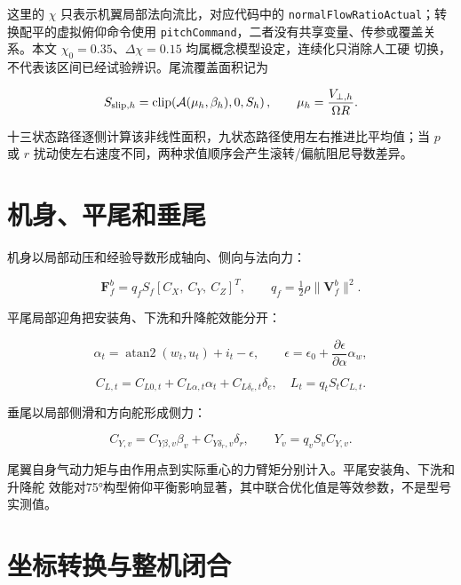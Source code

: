 \documentclass[UTF8,12pt,oneside,openany,fontset=windows]{ctexbook}
\begin{document}
这里的 \(\chi\) 只表示机翼局部法向流比，对应代码中的 \texttt{normalFlowRatioActual}；转换配平的虚拟俯仰命令使用 \texttt{pitchCommand}，二者没有共享变量、传参或覆盖关系。本文 \(\chi_0=0.35\)、\(\Delta\chi=0.15\) 均属概念模型设定，连续化只消除人工硬 切换，不代表该区间已经试验辨识。尾流覆盖面积记为

\begin{equation}
S_{{\rm slip},h}=\operatorname{clip}\!\left(\mathcal A(\mu_h,\beta_h),0,S_h\right),
\qquad \mu_h=\frac{V_{\perp,h}}{\Omega R}.
\end{equation}

十三状态路径逐侧计算该非线性面积，九状态路径使用左右推进比平均值；当 \(p\) 或 \(r\) 扰动使左右速度不同，两种求值顺序会产生滚转/偏航阻尼导数差异。

\section{机身、平尾和垂尾}

机身以局部动压和经验导数形成轴向、侧向与法向力：

\begin{equation}
\mathbf F_f^b=q_fS_f[C_X,\ C_Y,\ C_Z]^T,\qquad
q_f=\tfrac12\rho\|\mathbf V_f^b\|^2 .
\end{equation}

平尾局部迎角把安装角、下洗和升降舵效能分开：

\begin{equation}
\alpha_t=\operatorname{atan2}(w_t,u_t)+i_t-\epsilon,\qquad
\epsilon=\epsilon_0+\frac{\partial\epsilon}{\partial\alpha}\alpha_w,
\end{equation}

\begin{equation}
C_{L,t}=C_{L0,t}+C_{L\alpha,t}\alpha_t+C_{L\delta_e,t}\delta_e,
\quad L_t=q_tS_tC_{L,t}.
\end{equation}

垂尾以局部侧滑和方向舵形成侧力：

\begin{equation}
C_{Y,v}=C_{Y\beta,v}\beta_v+C_{Y\delta_r,v}\delta_r,\qquad
Y_v=q_vS_vC_{Y,v}.
\end{equation}

尾翼自身气动力矩与由作用点到实际重心的力臂矩分别计入。平尾安装角、下洗和升降舵 效能对75°构型俯仰平衡影响显著，其中联合优化值是等效参数，不是型号实测值。

\section{坐标转换与整机闭合}
\end{document}
